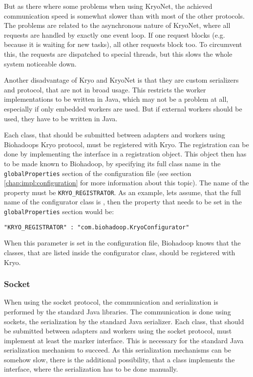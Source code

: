       But as there where some problems when using KryoNet, the achieved communication speed is somewhat slower than with most of the other protocols. The problems are related to the asynchronous nature of KryoNet, where all requests are handled by exactly one event loop. If one request blocks (e.g. because it is waiting for new tasks), all other requests block too. To circumvent this, the requests are dispatched to special threads, but this slows the whole system noticeable down.
      
      Another disadvantage of Kryo and KryoNet is that they are custom serializers and protocol, that are not in broad usage. This restricts the worker implementations to be written in Java, which may not be a problem at all, especially if only embedded workers are used. But if external workers should be used, they have to be written in Java.
      
      Each class, that should be submitted between adapters and workers using Biohadoops Kryo protocol, must be registered with Kryo. The registration can be done by implementing the  interface in a registration object. This object then has to be made known to Biohadoop, by specifying its full class name in the \texttt{globalProperties} section of the configuration file (see section \ref{chap:impl:configuration} for more information about this topic). The name of the property must be \texttt{KRYO\_REGISTRATOR}. As an example, lets assume, that the full name of the configurator class is , then the property that needs to be set in the \texttt{globalProperties} section would be:
      \begin{lstlisting}
"KRYO_REGISTRATOR" : "com.biohadoop.KryoConfigurator"
      \end{lstlisting}
      When this parameter is set in the configuration file, Biohadoop knows that the classes, that are listed inside the configurator class, should be registered with Kryo.
    \subsubsection{Socket}
      When using the socket protocol, the communication and serialization is performed by the standard Java libraries. The communication is done using sockets, the serialization by the standard Java serializer. Each class, that should be submitted between adapters and workers using the socket protocol, must implement at least the  marker interface. This is necessary for the standard Java serialization mechanism to succeed. As this serialization mechanisms can be somehow slow, there is the additional possibility, that a class implements the  interface, where the serialization has to be done manually.
      
